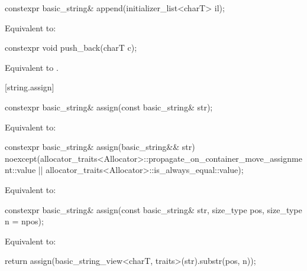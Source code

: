 %
\begin{itemdecl}
constexpr basic_string& append(initializer_list<charT> il);
\end{itemdecl}

\begin{itemdescr}
\pnum
\effects
Equivalent to: 
\end{itemdescr}

%
\begin{itemdecl}
constexpr void push_back(charT c);
\end{itemdecl}

\begin{itemdescr}
\pnum
\effects
Equivalent to
.
\end{itemdescr}

[string.assign]{}

%
\begin{itemdecl}
constexpr basic_string& assign(const basic_string& str);
\end{itemdecl}

\begin{itemdescr}
\pnum
\effects
Equivalent to: 
\end{itemdescr}

%
\begin{itemdecl}
constexpr basic_string& assign(basic_string&& str)
  noexcept(allocator_traits<Allocator>::propagate_on_container_move_assignment::value ||
           allocator_traits<Allocator>::is_always_equal::value);
\end{itemdecl}

\begin{itemdescr}
\pnum
\effects
Equivalent to: 
\end{itemdescr}


%
\begin{itemdecl}
constexpr basic_string& assign(const basic_string& str, size_type pos, size_type n = npos);
\end{itemdecl}

\begin{itemdescr}
\pnum
\effects
Equivalent to:
\begin{codeblock}
return assign(basic_string_view<charT, traits>(str).substr(pos, n));
\end{codeblock}
\end{itemdescr}

